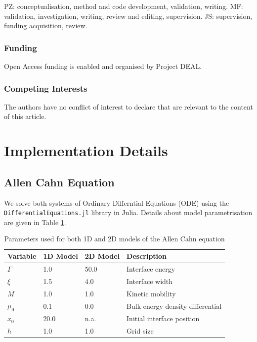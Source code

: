 \documentclass[sn-mathphys,Numbered]{sn-jnl}%
\theoremstyle{thmstyleone}%
\theoremstyle{thmstyletwo}%
\theoremstyle{thmstylethree}%
\begin{document}
\begin{appendices}
PZ: conceptualisation, method and code development, validation, writing. MF: validation, investigation, writing, review and editing, supervision. JS: supervision, funding acquisition, review.

\subsubsection*{Funding}

Open Access funding is enabled and organised by Project DEAL.

\subsubsection*{Competing Interests}

The authors have no conflict of interest to declare that are relevant to the content of this article.

\section{Implementation Details}
\subsection{Allen Cahn Equation}

We solve both systems of Ordinary Differntial Equations (ODE) using the \texttt{DifferentialEquations.jl} library in Julia.
Details about model parametrisation are given in Table \ref{tab:ac-parameters}.

\begin{table}[htbp!]
    \centering
    \caption{Parameters used for both 1D and 2D models of the Allen Cahn equation}
    \label{tab:ac-parameters}
    \begin{tabular}{llll} 
    \toprule
    \textbf{Variable} & \textbf{1D Model} & \textbf{2D Model} & \textbf{Description} \\ 
    \hline
    $\Gamma$ & 1.0 & 50.0 & Interface energy \\
    $\xi$ & 1.5 & 4.0 & Interface width \\
    $M$ & 1.0 & 1.0 & Kinetic mobility \\
    $\mu_0$ & 0.1 & 0.0 & Bulk energy density differential \\
    $x_0$ & 20.0 & n.a. & Initial interface position \\
    $h$ & 1.0 & 1.0 & Grid size \\
    \bottomrule
    \end{tabular}
    \end{table}


\end{appendices}
\end{document}
